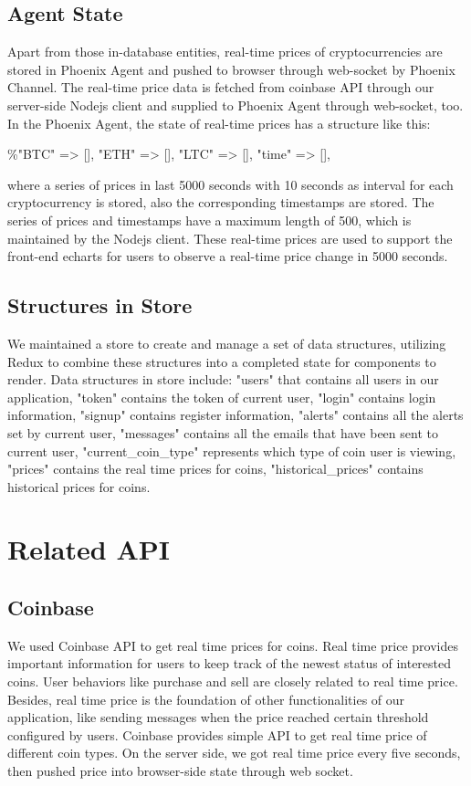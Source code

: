 \subsection{Agent State}
Apart from those in-database entities, real-time prices of 
cryptocurrencies are stored in Phoenix Agent and pushed to 
browser through web-socket by Phoenix Channel. The real-time 
price data is fetched from coinbase API through our server-side 
Nodejs client and supplied to Phoenix Agent through web-socket, 
too. In the Phoenix Agent, the state of real-time prices has 
a structure like this: 
\begin{center} 
\%{"BTC" => [], "ETH" => [], "LTC" => [], "time" => []}, 
\end{center}
where a series of prices in last 5000 seconds 
with 10 seconds as interval for each cryptocurrency is stored, 
also the corresponding timestamps are stored. The series of prices 
and timestamps have a maximum length of 500, which is maintained 
by the Nodejs client. These real-time prices are used to support 
the front-end echarts for users to observe a real-time price 
change in 5000 seconds. 
\subsection{Structures in Store}
We maintained a store to create and manage a set of data structures, 
utilizing Redux to combine these structures into a completed state 
for components to render. Data structures in store include: "users" 
that contains all users in our application, "token" contains the 
token of current user, "login" contains login information, "signup" 
contains register information, "alerts" contains all the alerts set 
by current user, "messages" contains all the emails that have been 
sent to current user, "current\_coin\_type" represents which type of 
coin user is viewing, "prices" contains the real time prices for 
coins, "historical\_prices" contains historical prices for coins.



\section{Related API}
\subsection{Coinbase}
We used Coinbase API to get real time prices for coins. Real 
time price provides important information for users to keep 
track of the newest status of interested coins. User behaviors 
like purchase and sell are closely related to real time price. 
Besides, real time price is the foundation of other functionalities 
of our application, like sending messages when the price reached 
certain threshold configured by users. Coinbase provides simple 
API to get real time price of different coin types. On the server 
side, we got real time price every five seconds, then pushed price 
into browser-side state through web socket.


